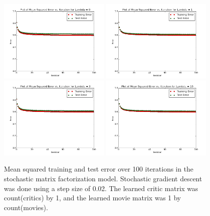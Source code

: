 \documentclass[12pt]{article}
\begin{document}
	\begin{figure}[H]
	\centering
	\includegraphics[width=0.48\textwidth]{plots/test-i100d1l0.png}
	\includegraphics[width=0.48\textwidth]{plots/test-i100d1l1.png}
	\includegraphics[width=0.48\textwidth]{plots/test-i100d1l3.png}
	\includegraphics[width=0.48\textwidth]{plots/test-i100d1l10.png}
	\caption{Mean squared training and test error over 100 iterations in the stochastic matrix factorization model. Stochastic gradient descent was done using a step size of 0.02. The learned critic matrix was count(critics) by 1, and the learned movie matrix was 1 by count(movies).}
	\label{fig:1}
	\end{figure}
\end{document}
